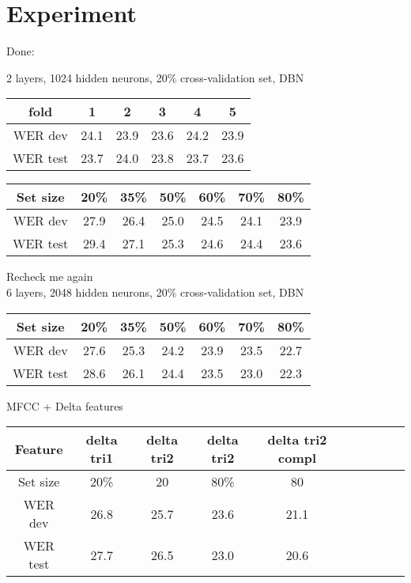 \chapter{Experiment}

Done:



\begin{center}

	2 layers, 1024 hidden neurons, 20\% cross-validation set, DBN
\begin{tabular}{ |c|c|c|c|c|c| } 
\hline
 fold &1&2&3&4&5 \\ 
 \hline
 WER dev &24.1&23.9&23.6&24.2&23.9 \\ 
 \hline
 WER test &23.7&24.0&23.8&23.7&23.6 \\ 
 \hline
\end{tabular}

\begin{tabular}{ |c|c|c|c|c|c|c| } 
\hline
Set size &20\%& 35\%& 50\%& 60\% & 70\%& 80\% \\ 
 \hline
 WER dev &27.9&26.4&25.0&24.5& 24.1 & 23.9 \\ 
 \hline
 WER test &29.4&27.1&25.3&24.6& 24.4 & 23.6 \\ 
 \hline
\end{tabular}

Recheck me again \\

6 layers, 2048 hidden neurons, 20\% cross-validation set, DBN 
\begin{tabular}{ |c|c|c|c|c|c|c| } 
\hline
Set size &20\%& 35\%& 50\%& 60\% & 70\%& 80\% \\ 
 \hline
 WER dev &27.6&25.3& 24.2 & 23.9 &23.5&22.7 \\ 
 \hline
 WER test &28.6&26.1&24.4&23.5&23.0&22.3 \\
 \hline
\end{tabular}


MFCC + Delta features \\
\begin{tabular}{ |c|c|c|c|c|c|c|c|c|c| } 
\hline
Feature  &delta tri1 & delta tri2 & delta tri2 &delta tri2 compl \\
\hline
Set size  &20\%& 20 & 80\%& 80  \\
 \hline
 WER dev  &26.8& 25.7 & 23.6 & 21.1 \\
 \hline
 WER test  &27.7& 26.5 & 23.0 & 20.6 \\
 \hline
\end{tabular}


\end{center}
